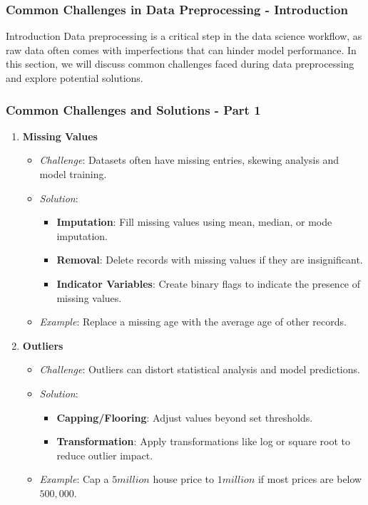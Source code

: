\documentclass[aspectratio=169]{beamer}
\begin{document}
\begin{frame}[fragile]
    \frametitle{Common Challenges in Data Preprocessing - Introduction}
    \begin{block}{Introduction}
        Data preprocessing is a critical step in the data science workflow, as raw data often comes with imperfections that can hinder model performance. In this section, we will discuss common challenges faced during data preprocessing and explore potential solutions.
    \end{block}
\end{frame}

\begin{frame}[fragile]
    \frametitle{Common Challenges and Solutions - Part 1}
    \begin{enumerate}
        \item \textbf{Missing Values}
            \begin{itemize}
                \item \textit{Challenge}: Datasets often have missing entries, skewing analysis and model training.
                \item \textit{Solution}:
                    \begin{itemize}
                        \item \textbf{Imputation}: Fill missing values using mean, median, or mode imputation.
                        \item \textbf{Removal}: Delete records with missing values if they are insignificant.
                        \item \textbf{Indicator Variables}: Create binary flags to indicate the presence of missing values.
                    \end{itemize}
                \item \textit{Example}: Replace a missing age with the average age of other records.
            \end{itemize}
        
        \item \textbf{Outliers}
            \begin{itemize}
                \item \textit{Challenge}: Outliers can distort statistical analysis and model predictions.
                \item \textit{Solution}:
                    \begin{itemize}
                        \item \textbf{Capping/Flooring}: Adjust values beyond set thresholds.
                        \item \textbf{Transformation}: Apply transformations like log or square root to reduce outlier impact.
                    \end{itemize}
                \item \textit{Example}: Cap a $5 million$ house price to $1 million$ if most prices are below $500,000$.
            \end{itemize}
    \end{enumerate}
\end{frame}
\end{document}
